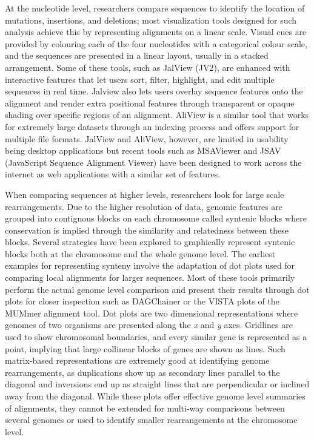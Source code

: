At the nucleotide level, researchers compare sequences to identify the location of mutations, insertions, and deletions; most visualization tools designed for such analysis achieve this by representing alignments on a linear scale. Visual cues are provided by colouring each of the four nucleotides with a categorical colour scale, and the sequences are presented in a linear layout, usually in a stacked arrangement. Some of these tools, such as JalView (JV2)\cite{waterhouse2009jalview}, are enhanced with interactive features that let users sort, filter, highlight, and edit multiple sequences in real time. Jalview also lets users overlay sequence features onto the alignment and render extra positional features through transparent or opaque shading over specific regions of an alignment. AliView is a similar tool that works for extremely large datasets through an indexing process and offers support for multiple file formats\cite{larsson2014aliview}. JalView and AliView, however, are limited in usability being desktop applications but recent tools such as MSAViewer\cite{yachdav2016msaviewer} and JSAV (JavaScript Sequence Alignment Viewer)\cite{martin2014viewing} have been designed to work across the internet as web applications with a similar set of features.

When comparing sequences at higher levels, researchers look for large scale rearrangements. Due to the higher resolution of data, genomic features are grouped into contiguous blocks on each chromosome called syntenic blocks where conservation is implied through the similarity and relatedness between these blocks.
Several strategies have been explored to graphically represent syntenic blocks both at the chromosome and the whole genome level. The earliest examples for representing synteny involve the adaptation of dot plots used for comparing local alignments for larger sequences. Most of these tools primarily perform the actual genome level comparison and present their results through dot plots for closer inspection such as DAGChainer\cite{haas2004dagchainer} or the VISTA plots of the MUMmer alignment tool\cite{kurtz2004versatile}. Dot plots are two dimensional representations where genomes of two organisms are presented along the \textit{x} and \textit{y} axes. Gridlines are used to show chromosomal boundaries, and every similar gene is represented as a point, implying that large collinear blocks of genes are shown as lines. Such matrix-based representations are extremely good at identifying genome rearrangements, as duplications show up as secondary lines parallel to the diagonal and inversions end up as straight lines that are perpendicular or inclined away from the diagonal. While these plots offer effective genome level summaries of alignments, they cannot be extended for multi-way comparisons between several genomes or used to identify smaller rearrangements at the chromosome level.

